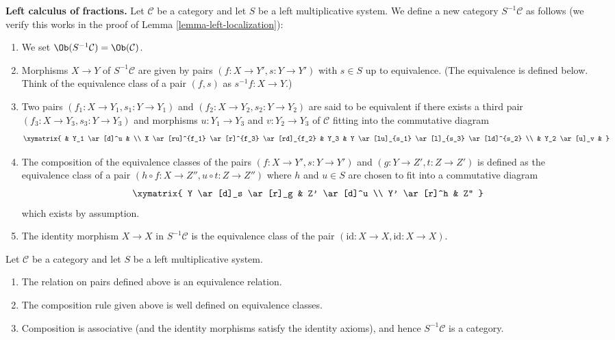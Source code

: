 \medskip\noindent
{\bf Left calculus of fractions.}
Let $\mathcal{C}$ be a category and let $S$ be a left multiplicative
system. We define a new category $S^{-1}\mathcal{C}$ as follows
(we verify this works in the proof of
Lemma \ref{lemma-left-localization}):
\begin{enumerate}
\item We set $\Ob(S^{-1}\mathcal{C}) = \Ob(\mathcal{C})$.
\item Morphisms $X \to Y$ of $S^{-1}\mathcal{C}$ are given by pairs
$(f : X \to Y', s : Y \to Y')$ with $s \in S$ up to equivalence.
(The equivalence is defined below. Think of the equivalence class
of a pair $(f, s)$ as $s^{-1}f : X \to Y$.)
\item Two pairs $(f_1 : X \to Y_1, s_1 : Y \to Y_1)$ and
$(f_2 : X \to Y_2, s_2 : Y \to Y_2)$ are said to be equivalent
if there exists a third pair $(f_3 : X \to Y_3, s_3 : Y \to Y_3)$
and morphisms $u : Y_1 \to Y_3$ and $v : Y_2 \to Y_3$ of $\mathcal{C}$
fitting into the commutative diagram
$$
\xymatrix{
 & Y_1 \ar[d]^u & \\
X \ar[ru]^{f_1} \ar[r]^{f_3} \ar[rd]_{f_2} &
Y_3 &
Y \ar[lu]_{s_1} \ar[l]_{s_3} \ar[ld]^{s_2} \\
& Y_2 \ar[u]_v &
}
$$
\item The composition of the equivalence classes of the pairs
$(f : X \to Y', s : Y \to Y')$ and $(g : Y \to Z', t : Z \to Z')$
is defined as the equivalence class of a pair
$(h \circ f : X \to Z'', u \circ t : Z \to Z'')$
where $h$ and $u \in S$ are chosen to fit into a commutative diagram
$$
\xymatrix{
Y \ar[d]_s \ar[r]_g & Z' \ar[d]^u \\
Y' \ar[r]^h & Z''
}
$$
which exists by assumption.
\item The identity morphism $X \to X$ in $S^{-1} \mathcal{C}$ is the
equivalence class of the pair $(\text{id} : X \to X,
\text{id} : X \to X)$.
\end{enumerate}

\begin{lemma}
\label{lemma-left-localization}
Let $\mathcal{C}$ be a category and let $S$ be a left multiplicative
system.
\begin{enumerate}
\item The relation on pairs defined above is an equivalence relation.
\item The composition rule given above is well defined on equivalence
classes.
\item Composition is associative (and the identity morphisms satisfy
the identity axioms), and hence $S^{-1}\mathcal{C}$ is a category.
\end{enumerate}
\end{lemma}

